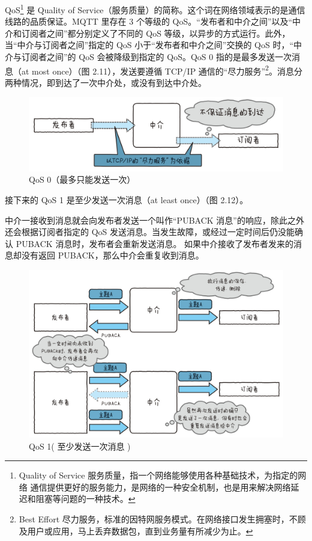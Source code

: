 \documentclass[12pt,UTF8]{ctexbook}
\begin{document}
QoS\footnote{Quality of Service	服务质量，指一个网络能够使用各种基础技术，为指定的网络	通信提供更好的服务能力，是网络的一种安全机制，也是用来解决网络延迟和阻塞等问题的一种技术。} 是 Quality of Service（服务质量）的简称。这个词在网络领域表示的是通信线路的品质保证。MQTT 里存在 3 个等级的 QoS。“发布者和中介之间”以及“中介和订阅者之间”都分别定义了不同的 QoS 等级，以异步的方式运行。此外，当“中介与订阅者之间”指定的 QoS 小于“发布者和中介之间”交换的 QoS 时，“中介与订阅者之间”的 QoS 会被降级到指定的 QoS。QoS 0 指的是最多发送一次消息（at most once）（图 2.11），发送要遵循 TCP/IP 通信的“尽力服务”\footnote{Best Effort 尽力服务，标准的因特网服务模式。在网络接口发生拥塞时，不顾及用户或应用，马上丢弃数据包，直到业务量有所减少为止。}。消息分两种情况，即到达了一次中介处，或没有到达中介处。

\begin{figure}[htbp]
	\centering
	\includegraphics[width=1\linewidth]{30}
	\caption{QoS 0（最多只能发送一次）}
	\label{fig:1}
\end{figure}

接下来的 QoS 1 是至少发送一次消息（at least once）（图 2.12）。

中介一接收到消息就会向发布者发送一个叫作“PUBACK 消息”的响应，除此之外还会根据订阅者指定的 QoS 发送消息。当发生故障，或经过一定时间后仍没能确认 PUBACK 消息时，发布者会重新发送消息。
如果中介接收了发布者发来的消息却没有返回 PUBACK，那么中介会重复收到消息。

\begin{figure}[htbp]
	\centering
	\includegraphics[width=1\linewidth]{31}
	\caption{QoS 1( 至少发送一次消息 )}
	\label{fig:1}
\end{figure}
\end{document}
